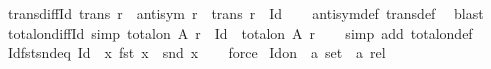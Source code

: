 \begin{isabellebody}
\endisatagproof
{\isafoldproof}%
%
\isadelimproof
\isanewline
%
\endisadelimproof
\isanewline
{}\isamarkupfalse%
\ trans{\isacharunderscore}{\kern0pt}diff{\isacharunderscore}{\kern0pt}Id{\isacharcolon}{\kern0pt}\ {\isachardoublequoteopen}trans\ r\ {\isasymLongrightarrow}\ antisym\ r\ {\isasymLongrightarrow}\ trans\ {\isacharparenleft}{\kern0pt}r\ {\isacharminus}{\kern0pt}\ Id{\isacharparenright}{\kern0pt}{\isachardoublequoteclose}\isanewline
%
\isadelimproof
\ \ %
\endisadelimproof
%
\isatagproof
{}\isamarkupfalse%
\ antisym{\isacharunderscore}{\kern0pt}def\ trans{\isacharunderscore}{\kern0pt}def\ \isamarkupfalse%
\ blast%
\endisatagproof
{\isafoldproof}%
%
\isadelimproof
\isanewline
%
\endisadelimproof
\isanewline
{}\isamarkupfalse%
\ total{\isacharunderscore}{\kern0pt}on{\isacharunderscore}{\kern0pt}diff{\isacharunderscore}{\kern0pt}Id\ {\isacharbrackleft}{\kern0pt}simp{\isacharbrackright}{\kern0pt}{\isacharcolon}{\kern0pt}\ {\isachardoublequoteopen}total{\isacharunderscore}{\kern0pt}on\ A\ {\isacharparenleft}{\kern0pt}r\ {\isacharminus}{\kern0pt}\ Id{\isacharparenright}{\kern0pt}\ {\isacharequal}{\kern0pt}\ total{\isacharunderscore}{\kern0pt}on\ A\ r{\isachardoublequoteclose}\isanewline
%
\isadelimproof
\ \ %
\endisadelimproof
%
\isatagproof
{}\isamarkupfalse%
\ {\isacharparenleft}{\kern0pt}simp\ add{\isacharcolon}{\kern0pt}\ total{\isacharunderscore}{\kern0pt}on{\isacharunderscore}{\kern0pt}def{\isacharparenright}{\kern0pt}%
\endisatagproof
{\isafoldproof}%
%
\isadelimproof
\isanewline
%
\endisadelimproof
\isanewline
{}\isamarkupfalse%
\ Id{\isacharunderscore}{\kern0pt}fstsnd{\isacharunderscore}{\kern0pt}eq{\isacharcolon}{\kern0pt}\ {\isachardoublequoteopen}Id\ {\isacharequal}{\kern0pt}\ {\isacharbraceleft}{\kern0pt}x{\isachardot}{\kern0pt}\ fst\ x\ {\isacharequal}{\kern0pt}\ snd\ x{\isacharbraceright}{\kern0pt}{\isachardoublequoteclose}\isanewline
%
\isadelimproof
\ \ %
\endisadelimproof
%
\isatagproof
{}\isamarkupfalse%
\ force%
\endisatagproof
{\isafoldproof}%
%
\isadelimproof
%
\endisadelimproof
%
\isadelimdocument
%
\endisadelimdocument
%
\isatagdocument
%
\isamarkuptrue%
%
\endisatagdocument
{\isafolddocument}%
%
\isadelimdocument
%
\endisadelimdocument
{}\isamarkupfalse%
\ Id{\isacharunderscore}{\kern0pt}on\ {\isacharcolon}{\kern0pt}{\isacharcolon}{\kern0pt}\ {\isachardoublequoteopen}{\isacharprime}{\kern0pt}a\ set\ {\isasymRightarrow}\ {\isacharprime}{\kern0pt}a\ rel{\isachardoublequoteclose}\isanewline

\end{isabellebody}

